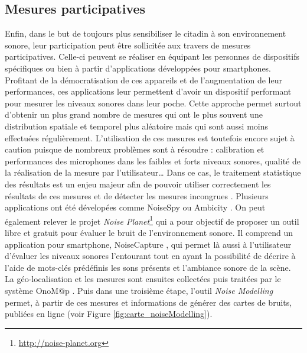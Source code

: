 \subsection{Mesures participatives}
Enfin, dans le but de toujours plus sensibiliser le citadin à son environnement sonore, leur participation peut être sollicitée aux travers de mesures participatives. Celle-ci peuvent se réaliser en équipant les personnes de dispositifs spécifiques \cite{aumond2017study} ou bien à partir d'applications développées pour smartphones. Profitant de la démocratisation de ces appareils et de l'augmentation de leur performances, ces applications leur permettent d'avoir un dispositif performant pour mesurer les niveaux sonores dans leur poche. Cette approche permet surtout d'obtenir un plus grand nombre de mesures qui ont le plus souvent une distribution spatiale et temporel plus aléatoire mais qui sont aussi moins effectuées régulièrement. L'utilisation de ces mesures est toutefois encore sujet à caution puisque de nombreux problèmes sont à résoudre : calibration et performances des microphones dans les faibles et forts niveaux sonores, qualité de la réalisation de la mesure par l'utilisateur\dots{} Dans ce cas, le traitement statistique des résultats est un enjeu majeur afin de pouvoir utiliser correctement les résultats de ces mesures et de détecter les mesures incongrues \cite{guillaume2016noise}. Plusieurs applications ont été dévelopées comme NoiseSpy \cite{kanjo_noisespy_2010} ou Ambicity \cite{ventura2017estimation}. On peut également relever le projet \textit{Noise Planet}\footnote{\url{http://noise-planet.org}} qui a pour objectif de proposer un outil libre et gratuit pour évaluer le bruit de l'environnement sonore. Il comprend un application pour smartphone, NoiseCapture \cite{guillaume2016noise}, qui permet là aussi à l'utilisateur d'évaluer les niveaux sonores l'entourant tout en ayant la possibilité de décrire à l'aide de mots-clés prédéfinis les sons présents et l'ambiance sonore de la scène. La géo-localisation et les mesures sont ensuites collectées puis traitées par le système OnoM@p \cite{bocher_onomp_2016}. Puis dans une troisième étape, l'outil \textit{Noise Modelling} permet, à partir de ces mesures et informations de générer des cartes de bruits, publiées en ligne (voir Figure \ref{fig:carte_noiseModelling}).\\ 


